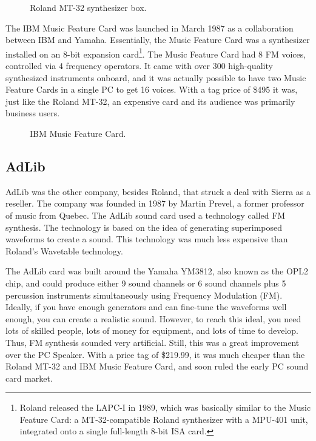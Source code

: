 \documentclass[book.tex]{subfiles}
\begin{document}
\par
  \begin{figure}[H] 
    \centering 
    \caption{Roland MT-32 synthesizer box.}
  \end{figure}


\par
The IBM Music Feature Card was launched in March 1987 as a collaboration between IBM and Yamaha. Essentially, the Music Feature Card was a synthesizer installed on an 8-bit expansion card\footnote{Roland released the LAPC-I in 1989, which was basically similar to the Music Feature Card: a MT-32-compatible Roland synthesizer with a MPU-401 unit, integrated onto a single full-length 8-bit ISA card.}. The Music Feature Card had 8 FM voices, controlled via 4 frequency operators. It came with over 300 high-quality synthesized instruments onboard, and it was actually possible to have two Music Feature Cards in a single PC to get 16 voices. With a tag price of \$495 it was, just like the Roland MT-32, an expensive card and its audience was primarily business users.\\

\par
  \begin{figure}[H] 
    \centering 
    \caption{IBM Music Feature Card.}
  \end{figure}




 \subsection{AdLib}
AdLib was the other company, besides Roland, that struck a deal with Sierra as a reseller. The company was founded in 1987 by Martin Prevel, a former professor of music from Quebec. The AdLib sound card used a technology called FM synthesis. The technology is based on the idea of generating superimposed waveforms to create a sound. This technology was much less expensive than Roland's Wavetable technology.\\

\par
The AdLib card was built around the Yamaha YM3812, also known as the OPL2 chip, and could produce either 9 sound channels or 6 sound channels plus 5 percussion instruments simultaneously using Frequency Modulation (FM). Ideally, if you have enough generators and can fine-tune the waveforms well enough, you can create a realistic sound. However, to reach this ideal, you need lots of skilled people, lots of money for equipment, and lots of time to develop. Thus, FM synthesis sounded very artificial. Still, this was a great improvement over the PC Speaker. With a price tag of \$219.99, it was much cheaper than the Roland MT-32 and IBM Music Feature Card, and soon ruled the early PC sound card market.\\
\end{document}
